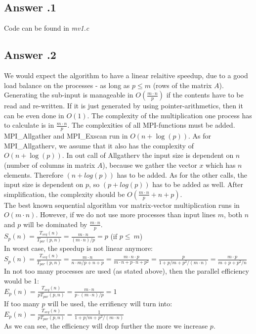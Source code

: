 \documentclass[a4paper,%
11pt,%
DIV=12,
headsepline,%
headings=normal,
]{scrartcl}
\newcounter{curex}
\newcommand{\answer}[1]{\subsection*{Answer \arabic{curex}.#1}}
\begin{document}
\answer{1}
Code can be found in \textit{mv1.c}

\answer{2}
We would expect the algorithm to have a linear relaitive speedup, due to a good load balance on the processes - as long as $p \leq m$  (rows of the matrix $A$). Generating the sub-input is manageable in $O\left(\frac{m \cdot n}{p}\right)$ if the contents have to be read and re-written. If it is just generated by using pointer-arithmetics, then  it can be even done in $O\left(1\right)$. The complexity of the multiplication one process has to calculate is in $\frac{m \cdot n}{p}$. The complexities of all MPI-functions must be added. MPI\_Allgather and MPI\_Exscan run in $O(n + \log(p))$. As for MPI\_Allgatherv, we assume that it also has the complexity of $O(n + \log(p))$. In out call of Allgatherv the input size is dependent on $n$ (number of columns in matrix $A$), because we gather the vector $x$ which has $n$ elements. Therefore $(n + log(p))$ has to be added. As for the other calls, the input size is dependent on $p$, so $(p + log(p))$ has to be added as well. After simplification, the complexity should be $O\left(\frac{m \cdot n}{p} + n + p\right)$.\\

\noindent The best known sequential algorithm vor matrix-vector multiplication runs in $O(m \cdot n)$. However, if we do not use more processes than input lines $m$, both $n$ and $p$ will be dominated by $\frac{m \cdot n}{p}$.
\\[0.5 em]
$S_{p}(n)=\frac{T_{seq}(n)}{T_{par}(p,n)} = \frac{m \cdot n}{(m \cdot n)/p } = p$ (if $p \leq\ m$)
\\[0.5 em]
In worst case, the speedup is not linear anymore:
\\[0.5 em]
$\displaystyle S_{p}(n)=\frac{T_{seq}(n)}{T_{par}(p,n)} = \frac{m \cdot n}{n \cdot m/p + n + p} = \frac{m \cdot n \cdot p}{m \cdot n + p \cdot  n + p^2} = \frac{p}{1 + p/m + p^2/(m \cdot n)} = \frac{m \cdot p}{m + p + p^2/n}$
\\[0.5 em]
In not too many processes are used (as stated above), then the parallel efficiency would be 1:
\\[0.5 em]
$\displaystyle E_{p}(n)=\frac{T_{seq}(n)}{pT_{par}(p,n)} = \frac{m \cdot n}{p \cdot (m \cdot n)/p} = 1$
\\[0.5 em]
If too many $p$ will be used, the errifiency will turn into:
\\[0.5 em]
$\displaystyle E_{p}(n)=\frac{T_{seq}(n)}{pT_{par}(p,n)} = \frac{1}{1 + p/m + p^2/(m \cdot n)}$
\\[0.5 em]
As we can see, the efficiency will drop further the more we increase $p$.
\end{document}
